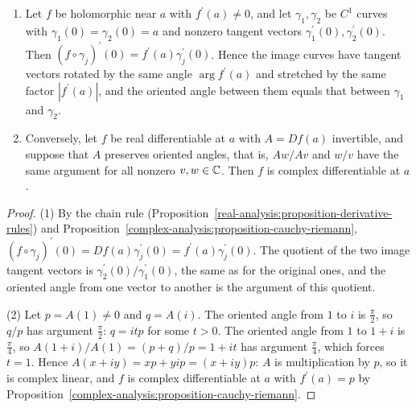 \begin{proposition}\label{complex-analysis:proposition-conformal}
\begin{enumerate}
\item Let $f$ be holomorphic near $a$ with $f^{\prime}(a) \neq 0$, and let $\gamma_1, \gamma_2$ be $C^1$ curves with $\gamma_1(0) = \gamma_2(0) = a$ and nonzero tangent vectors $\gamma_1^{\prime}(0), \gamma_2^{\prime}(0)$.
Then $(f \circ \gamma_j)^{\prime}(0) = f^{\prime}(a)\gamma_j^{\prime}(0)$. Hence the image curves have tangent vectors rotated by the same angle $\arg f^{\prime}(a)$ and stretched by the same factor
$|f^{\prime}(a)|$, and the oriented angle between them equals that between $\gamma_1$ and $\gamma_2$.
\item Conversely, let $f$ be real differentiable at $a$ with $A = Df(a)$ invertible, and suppose that $A$ preserves oriented angles, that is, $Aw/Av$ and $w/v$ have the same argument for all nonzero
$v, w \in \mathbb{C}$. Then $f$ is complex differentiable at $a$.
\end{enumerate}
\end{proposition}

\begin{proof}
(1) By the chain rule (Proposition~\ref{real-analysis:proposition-derivative-rules}) and Proposition~\ref{complex-analysis:proposition-cauchy-riemann},
$(f \circ \gamma_j)^{\prime}(0) = Df(a)\gamma_j^{\prime}(0) = f^{\prime}(a)\gamma_j^{\prime}(0)$. The quotient of the two image tangent vectors is $\gamma_2^{\prime}(0)/\gamma_1^{\prime}(0)$, the same as for the original
ones, and the oriented angle from one vector to another is the argument of this quotient.

(2) Let $p = A(1) \neq 0$ and $q = A(i)$. The oriented angle from $1$ to $i$ is $\frac\pi2$, so $q/p$ has argument $\frac\pi2$: $q = itp$ for some $t > 0$. The oriented angle from $1$ to $1 + i$ is $\frac\pi4$, so
$A(1 + i)/A(1) = (p + q)/p = 1 + it$ has argument $\frac\pi4$, which forces $t = 1$. Hence $A(x + iy) = xp + yip = (x + iy)p$: $A$ is multiplication by $p$, so it is complex linear, and $f$ is
complex differentiable at $a$ with $f^{\prime}(a) = p$ by Proposition~\ref{complex-analysis:proposition-cauchy-riemann}.
\end{proof}

